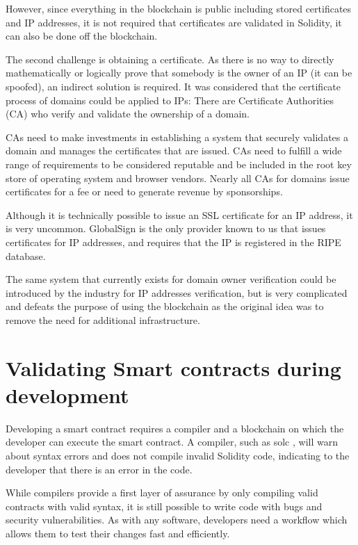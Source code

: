 However, since everything in the blockchain is public including stored certificates and IP addresses, it is not required that certificates are validated in Solidity, it can also be done off the blockchain. 

The second challenge is obtaining a certificate. As there is no way to directly mathematically or logically prove that somebody is the owner of an IP (it can be spoofed), an indirect solution is required. It was considered that the certificate process of domains could be applied to IPs: There are Certificate Authorities (CA) who verify and validate the ownership of a domain.

CAs need to make investments in establishing a system that securely validates a domain and manages the certificates that are issued. CAs need to fulfill a wide range of requirements \cite{BaselineRequirements} to be considered reputable and be included in the root key store of operating system and browser vendors. Nearly all CAs for domains issue certificates for a fee or need to generate revenue by sponsorships.

Although it is technically possible to issue an SSL certificate for an IP address, it is very uncommon. GlobalSign \cite{GlobalSign} is the only provider known to us that issues certificates for IP addresses, and requires that the IP is registered in the RIPE database.

The same system that currently exists for domain owner verification could be introduced by the industry for IP addresses verification, but is very complicated and defeats the purpose of using the blockchain as the original idea was to remove the need for additional infrastructure.

\section{Validating Smart contracts during development}
Developing a smart contract requires a compiler and a blockchain on which the developer can execute the smart contract. A compiler, such as solc \cite{Solc}, will warn about syntax errors and does not compile invalid Solidity code, indicating to the developer that there is an error in the code.

While compilers provide a first layer of assurance by only compiling valid contracts with valid syntax, it is still possible to write code with bugs and security vulnerabilities. As with any software, developers need a workflow which allows them to test their changes fast and efficiently.


